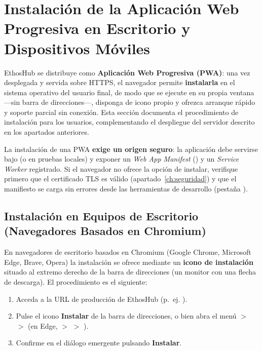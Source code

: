 \section[Instalación de la PWA (Escritorio y Móvil)]{Instalación de la Aplicación Web Progresiva en Escritorio y Dispositivos Móviles}%
\label{sec:pwa}

EthosHub se distribuye como \textbf{Aplicación Web Progresiva (PWA)}: una vez desplegada y
servida sobre HTTPS, el navegador permite \textbf{instalarla} en el sistema operativo del
usuario final, de modo que se ejecute en su propia ventana —sin barra de direcciones—,
disponga de icono propio y ofrezca arranque rápido y soporte parcial sin conexión. Esta
sección documenta el procedimiento de instalación para los usuarios, complementando el
despliegue del servidor descrito en los apartados anteriores.\par

\begin{NotaConfiguracion}
La instalación de una PWA \textbf{exige un origen seguro}: la aplicación debe servirse bajo
 (o  en pruebas locales) y exponer un
\textit{Web App Manifest} () y un \textit{Service Worker}
registrado. Si el navegador no ofrece la opción de instalar, verifique primero que el
certificado TLS es válido (apartado~\ref{ch:seguridad}) y que el manifiesto se carga sin
errores desde las herramientas de desarrollo (pestaña ).
\end{NotaConfiguracion}

\subsection[Instalación en Escritorio (Chrome, Edge)]{Instalación en Equipos de Escritorio (Navegadores Basados en Chromium)}%
\label{subsec:pwa-pc}

En navegadores de escritorio basados en Chromium (Google Chrome, Microsoft Edge, Brave,
Opera) la instalación se ofrece mediante un \textbf{icono de instalación} situado al extremo
derecho de la barra de direcciones (un monitor con una flecha de descarga). El procedimiento
es el siguiente:\par

\begin{enumerate}\setlength{\itemsep}{2pt}
  \item Acceda a la URL de producción de EthosHub (p.~ej. ).
  \item Pulse el icono \textbf{Instalar} de la barra de direcciones, o bien abra el menú
        \comando{\faEllipsisV} $>$  $>$  (en Edge,
        \comando{\faEllipsisV} $>$  $>$ ).
  \item Confirme en el diálogo emergente pulsando \textbf{Instalar}.
\end{enumerate}


